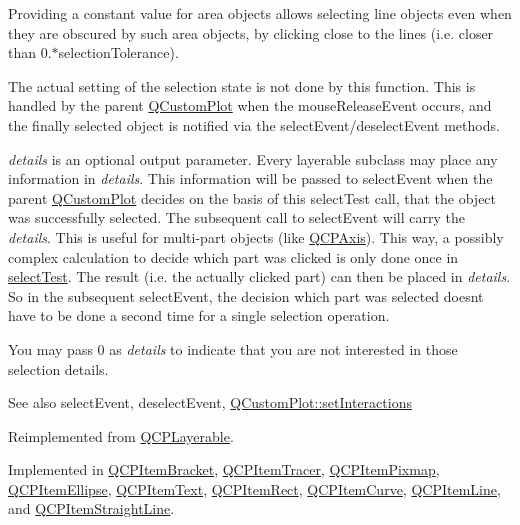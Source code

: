 Providing a constant value for area objects allows selecting line objects even when they are obscured by such area objects, by clicking close to the lines (i.\+e. closer than 0.$\ast$selection\+Tolerance).

The actual setting of the selection state is not done by this function. This is handled by the parent \hyperlink{classQCustomPlot}{Q\+Custom\+Plot} when the mouse\+Release\+Event occurs, and the finally selected object is notified via the select\+Event/deselect\+Event methods.

{\itshape details} is an optional output parameter. Every layerable subclass may place any information in {\itshape details}. This information will be passed to select\+Event when the parent \hyperlink{classQCustomPlot}{Q\+Custom\+Plot} decides on the basis of this select\+Test call, that the object was successfully selected. The subsequent call to select\+Event will carry the {\itshape details}. This is useful for multi-\/part objects (like \hyperlink{classQCPAxis}{Q\+C\+P\+Axis}). This way, a possibly complex calculation to decide which part was clicked is only done once in \hyperlink{classQCPAbstractItem_a96d522d10ffc0413b9a366c6f7f0476b}{select\+Test}. The result (i.\+e. the actually clicked part) can then be placed in {\itshape details}. So in the subsequent select\+Event, the decision which part was selected doesn\textquotesingle{}t have to be done a second time for a single selection operation.

You may pass 0 as {\itshape details} to indicate that you are not interested in those selection details.

\begin{DoxySeeAlso}{See also}
select\+Event, deselect\+Event, \hyperlink{classQCustomPlot_a5ee1e2f6ae27419deca53e75907c27e5}{Q\+Custom\+Plot\+::set\+Interactions} 
\end{DoxySeeAlso}


Reimplemented from \hyperlink{classQCPLayerable_a4001c4d0dfec55598efa4d531f2179a9}{Q\+C\+P\+Layerable}.



Implemented in \hyperlink{classQCPItemBracket_aa6933caff1d42c54bcebc769ef88c798}{Q\+C\+P\+Item\+Bracket}, \hyperlink{classQCPItemTracer_ae71f3728421c83c188c117279ca050fd}{Q\+C\+P\+Item\+Tracer}, \hyperlink{classQCPItemPixmap_a9f8436aa141fa0fb504191c882c2f4d9}{Q\+C\+P\+Item\+Pixmap}, \hyperlink{classQCPItemEllipse_acd7e5f9528630b2ab5987e2a5782eb7c}{Q\+C\+P\+Item\+Ellipse}, \hyperlink{classQCPItemText_a285b95bb6634c2e4f7768abb7a8bc69c}{Q\+C\+P\+Item\+Text}, \hyperlink{classQCPItemRect_af13b0797079b40b73d1c7286b76f18ac}{Q\+C\+P\+Item\+Rect}, \hyperlink{classQCPItemCurve_a741375c11667b5f9c95b2683f93ee514}{Q\+C\+P\+Item\+Curve}, \hyperlink{classQCPItemLine_a7541e5d9378ca121d07b0df3b24f7178}{Q\+C\+P\+Item\+Line}, and \hyperlink{classQCPItemStraightLine_a64cc3796f58ce856012732603edb2f1c}{Q\+C\+P\+Item\+Straight\+Line}.

